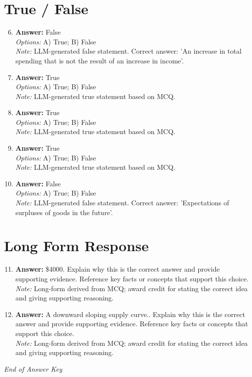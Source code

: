 \documentclass[12pt]{article}
\begin{document}
\section*{True / False}
\begin{enumerate}[label=\arabic*.]
\setcounter{enumi}{5}
\item \textbf{Answer:} False
\\ \textit{Options:} A) True; B) False
\\ \textit{Note:} LLM-generated false statement. Correct answer: 'An increase in total spending that is not the result of an increase in income'.
\item \textbf{Answer:} True
\\ \textit{Options:} A) True; B) False
\\ \textit{Note:} LLM-generated true statement based on MCQ.
\item \textbf{Answer:} True
\\ \textit{Options:} A) True; B) False
\\ \textit{Note:} LLM-generated true statement based on MCQ.
\item \textbf{Answer:} True
\\ \textit{Options:} A) True; B) False
\\ \textit{Note:} LLM-generated true statement based on MCQ.
\item \textbf{Answer:} False
\\ \textit{Options:} A) True; B) False
\\ \textit{Note:} LLM-generated false statement. Correct answer: 'Expectations of surpluses of goods in the future'.
\end{enumerate}

\section*{Long Form Response}
\begin{enumerate}[label=\arabic*.]
\setcounter{enumi}{10}
\item \textbf{Answer:} \$4000. Explain why this is the correct answer and provide supporting evidence. Reference key facts or concepts that support this choice.
\\ \textit{Note:} Long-form derived from MCQ; award credit for stating the correct idea and giving supporting reasoning.
\item \textbf{Answer:} A downward sloping supply curve.. Explain why this is the correct answer and provide supporting evidence. Reference key facts or concepts that support this choice.
\\ \textit{Note:} Long-form derived from MCQ; award credit for stating the correct idea and giving supporting reasoning.
\end{enumerate}

\vfill
\noindent\textit{End of Answer Key}
\end{document}
